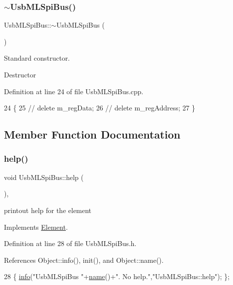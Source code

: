 \subsubsection{\texorpdfstring{$\sim$\+Usb\+M\+L\+Spi\+Bus()}{~UsbMLSpiBus()}}
{\footnotesize\ttfamily Usb\+M\+L\+Spi\+Bus\+::$\sim$\+Usb\+M\+L\+Spi\+Bus (\begin{DoxyParamCaption}{ }\end{DoxyParamCaption})\hspace{0.3cm}{\ttfamily [virtual]}}



Standard constructor. 

Destructor 

Definition at line 24 of file Usb\+M\+L\+Spi\+Bus.\+cpp.


\begin{DoxyCode}
24                           \{
25 \textcolor{comment}{//  delete m\_regData;}
26 \textcolor{comment}{//  delete m\_regAddress;}
27 \}
\end{DoxyCode}


\subsection{Member Function Documentation}
\mbox{\label{classUsbMLSpiBus_a9ff9537179dc4a861afcd3fea9e60da7}} 
\subsubsection{\texorpdfstring{help()}{help()}}
{\footnotesize\ttfamily void Usb\+M\+L\+Spi\+Bus\+::help (\begin{DoxyParamCaption}{ }\end{DoxyParamCaption})\hspace{0.3cm}{\ttfamily [inline]}, {\ttfamily [virtual]}}

printout help for the element 

Implements \hyperlink{classElement_a32c0de27acb08e17251cef88c3e9303a}{Element}.



Definition at line 28 of file Usb\+M\+L\+Spi\+Bus.\+h.



References Object\+::info(), init(), and Object\+::name().


\begin{DoxyCode}
28 \{ \hyperlink{classObject_a644fd329ea4cb85f54fa6846484b84a8}{info}(\textcolor{stringliteral}{"UsbMLSpiBus "}+\hyperlink{classObject_a300f4c05dd468c7bb8b3c968868443c1}{name}()+\textcolor{stringliteral}{". No help."},\textcolor{stringliteral}{"UsbMLSpiBus::help"}); \};
\end{DoxyCode}
\mbox{\label{classUsbMLSpiBus_a0c5faca75cb804316429a5e249166847}} 
